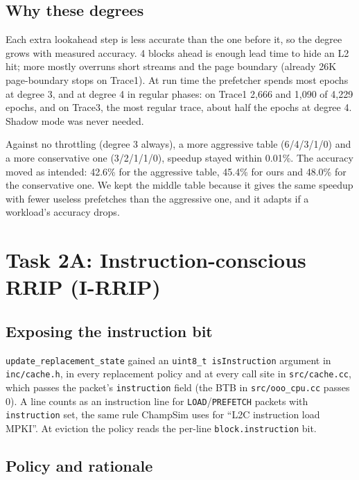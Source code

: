 \documentclass[12pt]{report}
\newcommand{\cfg}[1]{\texttt{#1}}
\begin{document}
\section{Why these degrees}

Each extra lookahead step is less accurate than the one before it, so the
degree grows with measured accuracy. 4 blocks ahead is enough lead time to
hide an L2 hit; more mostly overruns short streams and the page boundary
(already 26K page-boundary stops on Trace1). At run time the prefetcher spends
most epochs at degree 3, and at degree 4 in regular phases: on Trace1 2,666
and 1,090 of 4,229 epochs, and on Trace3, the most regular trace, about half
the epochs at degree 4. Shadow mode was never needed.

Against no throttling (degree 3 always), a more aggressive table (6/4/3/1/0)
and a more conservative one (3/2/1/1/0), speedup stayed within 0.01\%. The
accuracy moved as intended: 42.6\% for the aggressive table, 45.4\% for ours
and 48.0\% for the conservative one. We kept the middle table because it
gives the same speedup with fewer useless prefetches than the aggressive one,
and it adapts if a workload's accuracy drops.

\chapter{Task 2A: Instruction-conscious RRIP (I-RRIP)}

\section{Exposing the instruction bit}

\cfg{update\_replacement\_state} gained an \cfg{uint8\_t isInstruction}
argument in \cfg{inc/cache.h}, in every replacement policy and at every call
site in \cfg{src/cache.cc}, which passes the packet's \cfg{instruction} field
(the BTB in \cfg{src/ooo\_cpu.cc} passes 0). A line counts as an instruction
line for \cfg{LOAD}/\cfg{PREFETCH} packets with \cfg{instruction} set, the
same rule ChampSim uses for ``L2C instruction load MPKI''. At eviction the
policy reads the per-line \cfg{block.instruction} bit.

\section{Policy and rationale}
\end{document}
